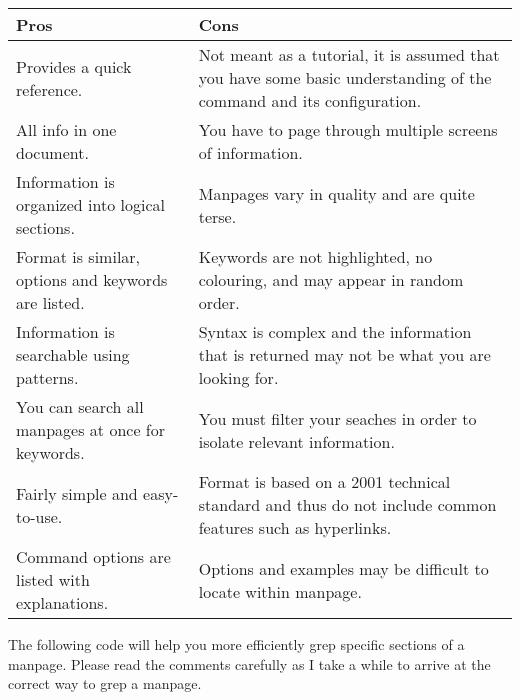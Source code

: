 \begin{tabularx}{\linewidth}{X | X} %
\caption{Manpages}\label{table:manpages-comparison}\\ %
\toprule
Pros & Cons \\%
\midrule
Provides a quick reference. & Not meant as a tutorial, it is assumed that you have some basic understanding of the command and its configuration.\\[2mm]
All info in one document. & You have to page through multiple screens of information.\\[2mm]
Information is organized into logical sections. & Manpages vary in quality and are quite terse.\\[2mm]
Format is similar, options and keywords are listed. & Keywords are not highlighted, no colouring, and may appear in random order.\\[2mm]
Information is searchable using patterns. & Syntax is complex and the information that is returned may not be what you are looking for.\\[2mm]
You can search all manpages at once for keywords. & You must filter your seaches in order to isolate relevant information.\\[2mm]
Fairly simple and easy-to-use. & Format is based on a 2001 technical standard and thus do not include common features such as hyperlinks.\\[2mm]
Command options are listed with explanations. & Options and examples may be difficult to locate within manpage.\\[2mm]
\bottomrule
\end{tabularx}

The following code will help you more efficiently grep specific sections of a manpage. Please read the comments carefully as I take a while to arrive at the correct way to grep a manpage.

